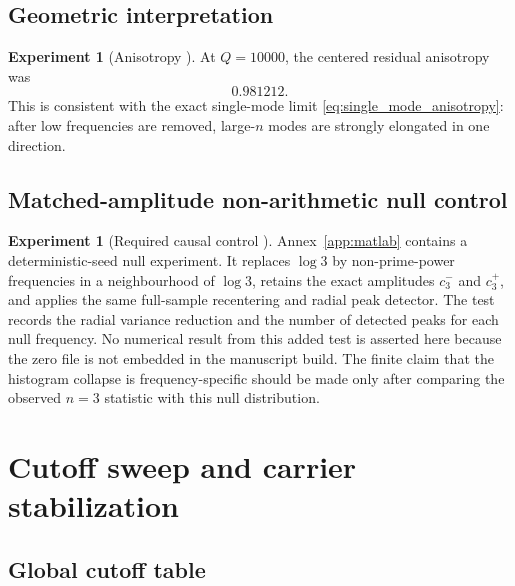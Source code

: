\documentclass[11pt]{amsart}
\numberwithin{equation}{section}
\theoremstyle{plain}
\theoremstyle{definition}
\newtheorem{experiment}[theorem]{Experiment}
\theoremstyle{remark}
\newcommand{\1}{\mathbf{1}}
\begin{document}
\subsection{Geometric interpretation}
\label{subsec:numerical_geometric_interpretation}

\begin{experiment}[Anisotropy {\normalfont[Numerical]}]
\label{exp:numerical_anisotropy}
At $Q=10000$, the centered residual anisotropy was
\begin{equation}
0.981212.
\label{eq:numerical_anisotropy_value}
\end{equation}
This is consistent with the exact single-mode limit
\eqref{eq:single_mode_anisotropy}: after low frequencies are removed,
large-$n$ modes are strongly elongated in one direction.
\end{experiment}


\subsection{Matched-amplitude non-arithmetic null control}
\label{subsec:n3_null_control}

\begin{experiment}[Required causal control {\normalfont[Numerical]}]
\label{exp:n3_matched_null_control}
Annex~\ref{app:matlab} contains a deterministic-seed null experiment.  It
replaces $\log3$ by non-prime-power frequencies in a neighbourhood of
$\log3$, retains the exact amplitudes $c_3^-$ and $c_3^+$, and applies the
same full-sample recentering and radial peak detector.  The test records the radial
variance reduction and the number of detected peaks for each null frequency.
No numerical result from this added test is asserted here because the zero
file is not embedded in the manuscript build.  The finite claim that the
histogram collapse is frequency-specific should be made only after comparing
the observed $n=3$ statistic with this null distribution.
\end{experiment}

\section{Cutoff sweep and carrier stabilization}
\label{sec:numerical_cutoff_sweep}

\subsection{Global cutoff table}
\label{subsec:numerical_global_cutoff_table}
\end{document}
